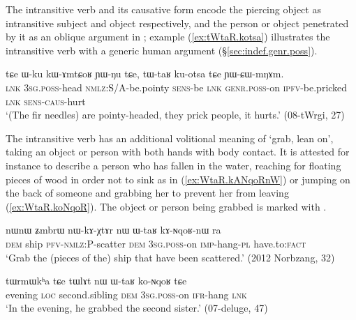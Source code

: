 The intransitive verb  and its causative form  encode the piercing object as intransitive subject and object respectively, and the person or object penetrated by it as an oblique argument in ; example (\ref{ex:tWtaR.kotsa}) illustrates the intransitive verb  with a generic human argument (§\ref{sec:indef.genr.poss}).

\begin{exe}
\ex \label{ex:tWtaR.kotsa}
\gll tɕe ɯ-ku kɯ-ɤmtɕoʁ ɲɯ-ŋu tɕe, tɯ-taʁ ku-otsa tɕe ɲɯ-ɕɯ-mŋɤm. \\
\textsc{lnk} \textsc{3sg}.\textsc{poss}-head \textsc{nmlz}:S/A-be.pointy \textsc{sens}-be \textsc{lnk} \textsc{genr}.\textsc{poss}-on \textsc{ipfv}-be.pricked \textsc{lnk} \textsc{sens}-\textsc{caus}-hurt \\
\glt `(The fir needles) are pointy-headed, they prick people, it hurts.'  (08-tWrgi, 27)
\end{exe} 

The intransitive verb  has an additional volitional meaning of `grab, lean on', taking an object or person with both hands with body contact. It is attested for instance to describe a person who has fallen in the water, reaching for floating pieces of wood in order not to sink as in (\ref{ex:WtaR.kANqoRnW}) or jumping on the back of someone and grabbing her to prevent her from leaving (\ref{ex:WtaR.koNqoR}). The object or person being grabbed is marked with .

\begin{exe}
\ex \label{ex:WtaR.kANqoRnW}
 \gll nɯnɯ ʑmbrɯ nɯ-kɤ-χtɤr nɯ ɯ-taʁ kɤ-ɴqoʁ-nɯ ra   \\
 \textsc{dem} ship \textsc{pfv}-\textsc{nmlz}:P-scatter \textsc{dem} \textsc{3sg}.\textsc{poss}-on \textsc{imp}-hang-\textsc{pl} have.to:\textsc{fact} \\
 \glt `Grab the (pieces of the) ship that have been scattered.' (2012 Norbzang, 32)
\end{exe}

\begin{exe}
\ex \label{ex:WtaR.koNqoR}
\gll tɯrmɯkʰa tɕe tɯlɤt nɯ ɯ-taʁ ko-ɴqoʁ tɕe \\
evening \textsc{loc} second.sibling \textsc{dem} \textsc{3sg}.\textsc{poss}-on \textsc{ifr}-hang \textsc{lnk} \\
\glt `In the evening, he grabbed the second sister.' (07-deluge, 47)
\end{exe} 


